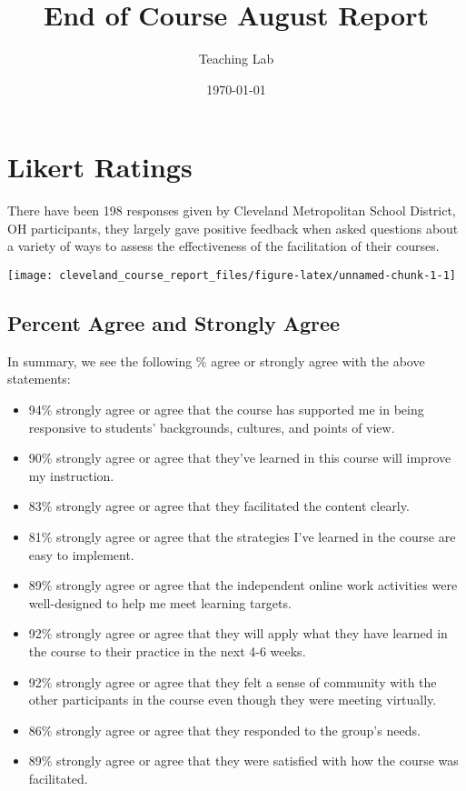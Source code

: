 \documentclass[10,a4paperpaper,]{article}
\title{End of Course August Report}
\author{Teaching Lab}
\date{\today}
\begin{document}
\renewcommand{\contentsname}{Table of Contents}

\renewcommand{\pagename}{Page}


\maketitle
\tableofcontents
{}
\clearpage

\section{Likert Ratings}

There have been 198 responses given by Cleveland Metropolitan School
District, OH participants, they largely gave positive feedback when
asked questions about a variety of ways to assess the effectiveness of
the facilitation of their courses.

\begin{center}\texttt{[image: cleveland\_course\_report\_files/figure-latex/unnamed-chunk-1-1]} \end{center}

\subsection{Percent Agree and Strongly Agree}

In summary, we see the following \% agree or strongly agree with the
above statements:

\begin{itemize}
\tightlist
\item
  94\% strongly agree or agree that the course has supported me in being
  responsive to students' backgrounds, cultures, and points of view.
\item
  90\% strongly agree or agree that they've learned in this course will
  improve my instruction.
\item
  83\% strongly agree or agree that they facilitated the content
  clearly.
\item
  81\% strongly agree or agree that the strategies I've learned in the
  course are easy to implement.
\item
  89\% strongly agree or agree that the independent online work
  activities were well-designed to help me meet learning targets.
\item
  92\% strongly agree or agree that they will apply what they have
  learned in the course to their practice in the next 4-6 weeks.
\item
  92\% strongly agree or agree that they felt a sense of community with
  the other participants in the course even though they were meeting
  virtually.
\item
  86\% strongly agree or agree that they responded to the group's needs.
\item
  89\% strongly agree or agree that they were satisfied with how the
  course was facilitated.
\end{itemize}
\end{document}
